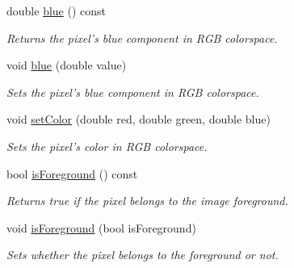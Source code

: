 \begin{CompactItemize}
double \hyperlink{class_pixel_978b4078a48ff2a67b55dd10eec78fb2}{blue} () const 
\begin{CompactList}\small\item\em Returns the pixel's blue component in RGB colorspace. \item\end{CompactList}\item 
void \hyperlink{class_pixel_ff3909b84c97a1c3d14a773c8825ade1}{blue} (double value)
\begin{CompactList}\small\item\em Sets the pixel's blue component in RGB colorspace. \item\end{CompactList}\item 
void \hyperlink{class_pixel_5543267a64a29c66f12a2801b101e6db}{setColor} (double red, double green, double blue)
\begin{CompactList}\small\item\em Sets the pixel's color in RGB colorspace. \item\end{CompactList}\item 
bool \hyperlink{class_pixel_48f2d29f9542f9c2ce293422ab07ffcc}{isForeground} () const 
\begin{CompactList}\small\item\em Returns true if the pixel belongs to the image foreground. \item\end{CompactList}\item 
void \hyperlink{class_pixel_1b1d5b2ed9285b837d85c33f09cab3f9}{isForeground} (bool isForeground)
\begin{CompactList}\small\item\em Sets whether the pixel belongs to the foreground or not. \item\end{CompactList}\end{CompactItemize}
